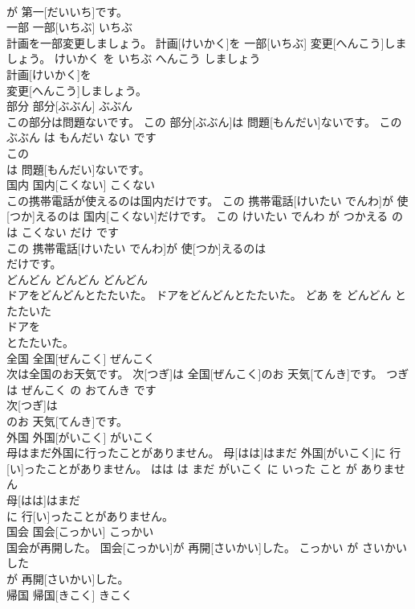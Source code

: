 \documentclass[8pt]{extreport}
\begin{document}
\begin{CJK}{UTF8}{min}
\\	が 第一[だいいち]です。			
\\	一部	一部[いちぶ]	いちぶ	
\\	計画を一部変更しましょう。	計画[けいかく]を 一部[いちぶ] 変更[へんこう]しましょう。	けいかく を いちぶ へんこう しましょう	
\\	計画[けいかく]を
\\	変更[へんこう]しましょう。			
\\	部分	部分[ぶぶん]	ぶぶん	
\\	この部分は問題ないです。	この 部分[ぶぶん]は 問題[もんだい]ないです。	この ぶぶん は もんだい ない です	
\\	この
\\	は 問題[もんだい]ないです。			
\\	国内	国内[こくない]	こくない	
\\	この携帯電話が使えるのは国内だけです。	この 携帯電話[けいたい でんわ]が 使[つか]えるのは 国内[こくない]だけです。	この けいたい でんわ が つかえる の は こくない だけ です	
\\	この 携帯電話[けいたい でんわ]が 使[つか]えるのは
\\	だけです。			
\\	どんどん	どんどん	どんどん	
\\	ドアをどんどんとたたいた。	ドアをどんどんとたたいた。	どあ を どんどん と たたいた	
\\	ドアを
\\	とたたいた。			
\\	全国	全国[ぜんこく]	ぜんこく	
\\	次は全国のお天気です。	次[つぎ]は 全国[ぜんこく]のお 天気[てんき]です。	つぎ は ぜんこく の おてんき です	
\\	次[つぎ]は
\\	のお 天気[てんき]です。			
\\	外国	外国[がいこく]	がいこく	
\\	母はまだ外国に行ったことがありません。	母[はは]はまだ 外国[がいこく]に 行[い]ったことがありません。	はは は まだ がいこく に いった こと が ありません	
\\	母[はは]はまだ
\\	に 行[い]ったことがありません。			
\\	国会	国会[こっかい]	こっかい	
\\	国会が再開した。	国会[こっかい]が 再開[さいかい]した。	こっかい が さいかい した	
\\	が 再開[さいかい]した。			
\\	帰国	帰国[きこく]	きこく	

\end{CJK}
\end{document}
